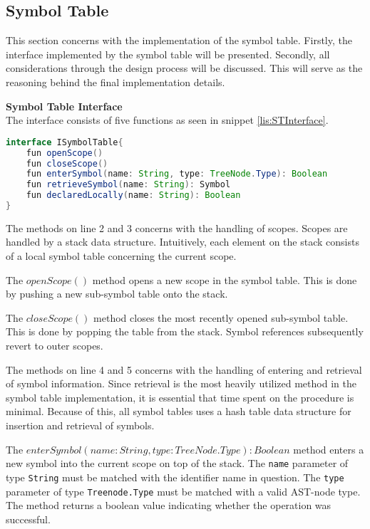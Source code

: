 \subsection{Symbol Table}
This section concerns with the implementation of the symbol table. 
Firstly, the interface implemented by the symbol table will be presented.
Secondly, all considerations through the design process will be discussed.
This will serve as the reasoning behind the final implementation details.

\textbf{Symbol Table Interface}\\
The interface consists of five functions as seen in snippet \ref{lis:STInterface}.

\begin{lstlisting}[language=java,label=lis:STInterface,caption=The interface which all symbol table implementations must implement.]
interface ISymbolTable{
	fun openScope()
	fun closeScope()
	fun enterSymbol(name: String, type: TreeNode.Type): Boolean
	fun retrieveSymbol(name: String): Symbol
	fun declaredLocally(name: String): Boolean
}
\end{lstlisting}

The methods on line 2 and 3 concerns with the handling of scopes.
Scopes are handled by a stack data structure.
Intuitively, each element on the stack consists of a local symbol table concerning the current scope.

The $openScope()$ method opens a new scope in the symbol table.
This is done by pushing a new sub-symbol table onto the stack.

The $closeScope()$ method closes the most recently opened sub-symbol table.
This is done by popping the table from the stack.
Symbol references subsequently revert to outer scopes.

The methods on line 4 and 5 concerns with the handling of entering and retrieval of symbol information.
Since retrieval is the most heavily utilized method in the symbol table implementation, it is essential that time spent on the procedure is minimal.
Because of this, all symbol tables uses a hash table data structure for insertion and retrieval of symbols. 

The $enterSymbol(name: String, type: TreeNode.Type): Boolean$ method enters a new symbol into the current scope on top of the stack.
The \texttt{name} parameter of type \texttt{String} must be matched with the identifier name in question.
The \texttt{type} parameter of type \texttt{Treenode.Type} must be matched with a valid AST-node type.
The method returns a boolean value indicating whether the operation was successful.

